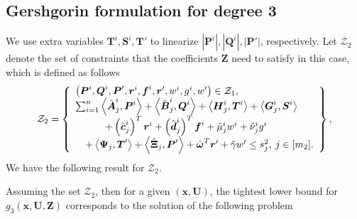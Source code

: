 \documentclass[opre,nonblindrev]{informs3} %
\begin{document}




\begin{appendices} 
\section{Gershgorin formulation for degree 3} 
We use extra variables $\boldsymbol{T}^i,\boldsymbol{S}^i, \boldsymbol{T}'$ to linearize $\left \lvert \boldsymbol{P}^i \right \rvert, \left \lvert \boldsymbol{Q}^i \right \rvert, \left \lvert \boldsymbol{P}' \right \rvert$, respectively. Let $\mathcal{Z}_2$ denote the set of constraints that the coefficients $\boldsymbol{Z}$ need to satisfy in this case, which is defined as follows
\begin{align*}
    \mathcal{Z}_2 = \left\{ \begin{array}{lr} 
     \left( \boldsymbol{P}^i, \boldsymbol{Q}^i, \boldsymbol{P}', \boldsymbol{r}^i, \boldsymbol{f}^i, \boldsymbol{r}', w^i, g^i, w' \right) \in \mathcal{Z}_1, \\ 
      \sum_{i=1}^n \left \langle \Hat{\boldsymbol{A}}_j^i, \boldsymbol{P}^i \right \rangle + \left \langle \Hat{\boldsymbol{B}}_j^i, \boldsymbol{Q}^i \right \rangle + \left \langle \boldsymbol{H}_j^i, \boldsymbol{T}^i \right \rangle + \left \langle \boldsymbol{G}_j^i, \boldsymbol{S}^i \right \rangle \\ 
      \quad \quad \quad + \left( \Hat{\boldsymbol{c}}_j^i \right)^T \boldsymbol{r}^i + \left( \Hat{\boldsymbol{d}}_j^i \right)^T \boldsymbol{f}^i + \Hat{\mu}_j^i w^i + \Hat{\nu}_j^i g^i \\ 
      \quad + \left \langle \boldsymbol{\Psi}_j, \boldsymbol{T}' \right \rangle + \left \langle \Hat{\boldsymbol{\Xi}}_j, \boldsymbol{P}' \right \rangle + \Hat{\boldsymbol{\omega}}^T \boldsymbol{r}' + \hat{\gamma}w'  \le s_j^2, \: j \in [m_2].
    \end{array} \right\},
\end{align*} 
We have the following result for $\mathcal{Z}_2$. 
\begin{theorem}
\label{thm:gersh_degree3}
    Assuming the set $\mathcal{Z}_2$, then for a given $(\boldsymbol{x},\boldsymbol{U})$, the tightest lower bound for $g_3(\boldsymbol{x},\boldsymbol{U},\boldsymbol{Z})$ corresponds to the solution of the following problem


\end{theorem}
\end{appendices}
\end{document}
